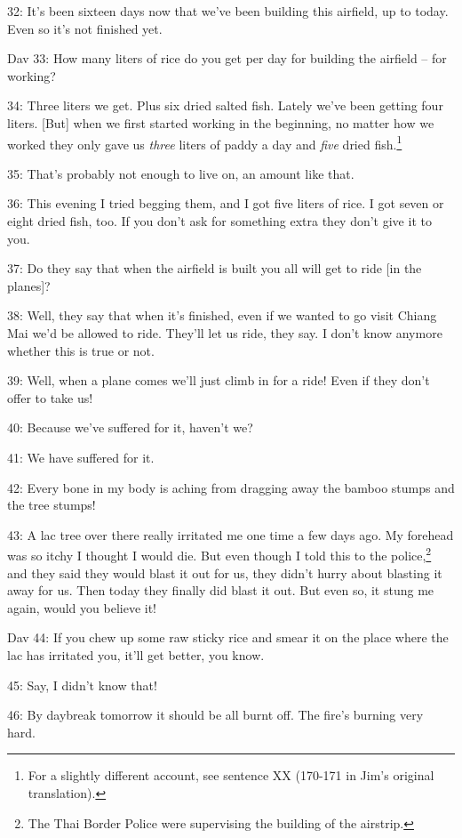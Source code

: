 32: It's been sixteen days now that we've been building this airfield, up to today.
Even so it's not finished yet.

Dav 33: How many liters of rice do you get per day for building the airfield --
for working?

34: Three liters we get. Plus six dried salted fish. Lately we've been getting
four liters. [But] when we first started working in the beginning, no matter how
we worked they only gave us \textit{three} liters of paddy a day and \textit{five}
dried fish.\footnote{For a slightly different account, see sentence XX (170-171 in Jim's original translation).}

35: That's probably not enough to live on, an amount like that.

36: This evening I tried begging them, and I got five liters of rice. I got seven
or eight dried fish, too. If you don't ask for something extra they don't give
it to you.

37: Do they say that when the airfield is built you all will get to ride [in the
planes]?

38: Well, they say that when it's finished, even if we wanted to go visit Chiang
Mai we'd be allowed to ride. They'll let us ride, they say. I don't know anymore
whether this is true or not.

39: Well, when a plane comes we'll just climb in for a ride! Even if they don't
offer to take us!

40: Because we've suffered for it, haven't we?

41: We have suffered for it.

42: Every bone in my body is aching from dragging away the bamboo stumps and the
tree stumps!

43: A lac tree over there really irritated me one time a few days ago. My forehead
was so itchy I thought I would die. But even though I told this to the police,\footnote{The Thai Border Police were supervising the building of the airstrip.}
and they said they would blast it out for us, they didn't hurry about blasting
it away for us. Then today they finally did blast it out. But even so, it stung
me again, would you believe it!

Dav 44: If you chew up some raw sticky rice and smear it on the place where the
lac has irritated you, it'll get better, you know.

45: Say, I didn't know that!

46: By daybreak tomorrow it should be all burnt off. The fire's burning very hard.

